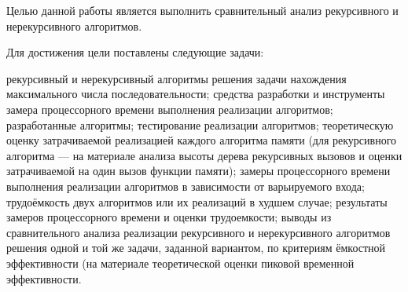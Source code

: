 
Целью данной работы является выполнить сравнительный анализ рекурсивного и нерекурсивного алгоритмов.

Для достижения цели поставлены следующие задачи:
\begin{itemize}
 рекурсивный и нерекурсивный алгоритмы решения задачи нахождения максимального числа последовательности;
 средства разработки и инструменты замера процессорного времени выполнения реализации алгоритмов;
 разработанные алгоритмы;
 тестирование реализации алгоритмов;
 теоретическую оценку затрачиваемой реализацией каждого алгоритма памяти (для рекурсивного алгоритма — на материале анализа высоты дерева рекурсивных вызовов и оценки затрачиваемой на один вызов функции памяти);
 замеры процессорного времени выполнения реализации алгоритмов в зависимости от варьируемого входа;
 трудоёмкость двух алгоритмов или их реализаций в худшем случае;
 результаты замеров процессорного времени и оценки трудоемкости;
 выводы из сравнительного анализа реализации рекурсивного и нерекурсивного алгоритмов решения одной и той же задачи, заданной вариантом, по критериям ёмкостной эффективности (на материале теоретической оценки пиковой временной эффективности.
\end{itemize}
\clearpage
